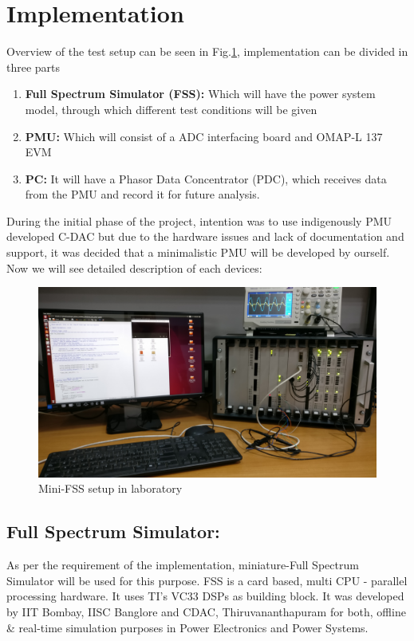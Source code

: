 \section{Implementation}
Overview of the test setup can be seen in Fig.\ref{fig:fss_setup}, implementation can be divided in three parts
\begin{enumerate}
\item \textbf{Full Spectrum Simulator (FSS):} Which will have the power system model, through which different test conditions will be given
\item \textbf{PMU:} Which will consist of a ADC interfacing board and OMAP-L 137 EVM
\item \textbf{PC:} It will have a Phasor Data Concentrator (PDC), which receives data from the PMU and record it for future analysis.
\end{enumerate}
During the initial phase of the project, intention was to use indigenously PMU developed C-DAC but due to the hardware issues and lack of documentation and support, it was decided that a minimalistic PMU will be developed by ourself. Now we will see detailed description of each devices: 

\begin{figure}[th]
\centering
\includegraphics[width=\textwidth]{fig/FSS_setup.jpg}
\caption{Mini-FSS setup in laboratory}
\label{fig:fss_setup}
\end{figure}

\subsection{Full Spectrum Simulator:}
As per the requirement of the implementation, miniature-Full Spectrum Simulator will be used for this purpose. FSS is a card based, multi CPU - parallel processing hardware. It uses TI's VC33 DSPs as building block. It was developed by IIT Bombay, IISC Banglore and CDAC, Thiruvananthapuram for both, offline \& real-time  simulation purposes in Power Electronics and Power Systems.

